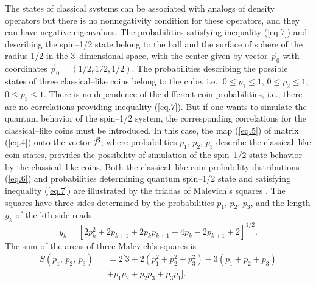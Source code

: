 \documentclass[12pt]{article}
\begin{document}
The states of classical systems can be associated with analogs of density operators \cite{OVVILasRes,Clmech} but there is no nonnegativity condition for these operators, and they can have negative eigenvalues. The probabilities satisfying inequality (\ref{eq.7}) and describing the spin--1/2 state belong to the ball and the surface of sphere of the radius 1/2  in the 3--dimensional space, with the center given by vector $\vec p_0$ with coordinates $\vec p_0=(1/2,1/2,1/2)$. The probabilities describing the possible states of three classical--like coins belong to the cube, i.e., $0\leq p_1\leq1,\,0\leq p_2\leq1$, $0\leq p_3\leq1$. There is no dependence of the different coin probabilities, i.e., there are no correlations providing inequality (\ref{eq.7}). But if one wants to simulate the quantum behavior of the spin--1/2 system, the corresponding correlations for the classical--like coins must be introduced. In this case, the map (\ref{eq.5}) of matrix (\ref{eq.4}) onto the vector $\vec{\cal P}$, where probabilities $p_1,\,p_2,\,p_3$ describe the classical--like coin states, provides the possibility of simulation of the spin--1/2 state behavior by the classical--like coins. Both the classical--like coin probability distributions (\ref{eq.6}) and probabilities determining quantum spin--1/2 state and satisfying inequality (\ref{eq.7}) are illustrated by the triadas of Malevich's squares \cite{Chernega1,Chernega2,Chernega3,PhysScr2018,Entr2018}. The squares have three sides determined by the probabilities $p_1,\,p_2,\,p_3$, and the length $y_k$ of the kth side reads 
\begin{equation}\label{eq.9}
y_k=[2p_k^2+2p_{k+1}+2p_k p_{k+1}-4p_k-2p_{k+1}+2]^{1/2}.
\end{equation}
The sum of the areas of three Malevich's squares is
\begin{eqnarray}%
S(p_1,\,p_2,\,p_3)&&=2[3+2(p_1^2+p_2^2+p_3^2)-3(p_1+p_2+p_3)\nonumber\\
&&+p_1p_2+p_2p_3+p_3p_1].\label{eq.10}
\end{eqnarray}
\end{document}
